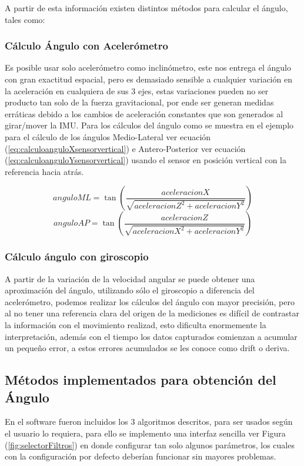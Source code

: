 \documentclass[12pt,a4paper]{article}
\begin{document}
A partir de esta información existen distintos métodos para calcular el ángulo, tales como:


\subsubsection{Cálculo Ángulo con Acelerómetro} Es posible usar solo acelerómetro como inclinómetro, este nos entrega el ángulo con gran exactitud espacial, pero es demasiado sensible a cualquier variación en la aceleración en cualquiera de sus 3 ejes, estas variaciones pueden no ser producto tan solo de la fuerza gravitacional, por ende ser generan medidas erráticas debido a los cambios de aceleración constantes que son generados al girar/mover la IMU.
Para los cálculos del ángulo como se muestra en el ejemplo para el cálculo de los ángulos Medio-Lateral ver ecuación (\ref{eq:calculoanguloXsensorvertical}) e Antero-Posterior ver ecuación (\ref{eq:calculoanguloYsensorvertical}) usando el sensor en posición vertical con la referencia hacia atrás.

\begin{figure}[H]
	\begin{equation}
	anguloML = \tan{\left(\frac{aceleracionX}{\sqrt{aceleracionZ^{2}+aceleracionY^{2}}}\right)}
	\label{eq:calculoanguloXsensorvertical}
	\end{equation}
	\begin{equation}
	anguloAP = \tan{\left(\frac{aceleracionZ}{\sqrt{aceleracionX^{2}+aceleracionY^{2}}}\right)}
	\label{eq:calculoanguloYsensorvertical}
	\end{equation}
\end{figure}

\subsubsection{Cálculo ángulo con giroscopio} 
A partir de la variación de la velocidad angular se puede obtener una aproximación del ángulo, utilizando sólo el giroscopio a diferencia del acelerómetro, podemos realizar los cálculos del ángulo con mayor precisión, pero al no tener una referencia clara del origen de la mediciones es difícil de contrastar la información con el movimiento realizad, esto dificulta enormemente la interpretación, además con el tiempo los datos capturados comienzan a acumular un pequeño error, a estos errores acumulados se les conoce como drift o deriva.

\newpage
\subsection{Métodos implementados para obtención del Ángulo}
En el software fueron incluidos los 3 algoritmos descritos, para ser usados según el usuario lo requiera, para ello se implemento una interfaz sencilla ver Figura (\ref{fig:selectorFiltros}) en donde configurar tan solo algunos parámetros, los cuales con la configuración por defecto deberían funcionar sin mayores problemas.
\end{document}
